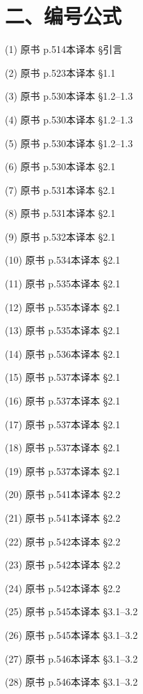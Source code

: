 \section*{二、编号公式}

\begin{termlist}
\item[(1)] 原书 p.514\quad 本译本 §引言
\item[(2)] 原书 p.523\quad 本译本 §1.1
\item[(3)] 原书 p.530\quad 本译本 §1.2--1.3
\item[(4)] 原书 p.530\quad 本译本 §1.2--1.3
\item[(5)] 原书 p.530\quad 本译本 §1.2--1.3
\item[(6)] 原书 p.530\quad 本译本 §2.1
\item[(7)] 原书 p.531\quad 本译本 §2.1
\item[(8)] 原书 p.531\quad 本译本 §2.1
\item[(9)] 原书 p.532\quad 本译本 §2.1
\item[(10)] 原书 p.534\quad 本译本 §2.1
\item[(11)] 原书 p.535\quad 本译本 §2.1
\item[(12)] 原书 p.535\quad 本译本 §2.1
\item[(13)] 原书 p.535\quad 本译本 §2.1
\item[(14)] 原书 p.536\quad 本译本 §2.1
\item[(15)] 原书 p.537\quad 本译本 §2.1
\item[(16)] 原书 p.537\quad 本译本 §2.1
\item[(17)] 原书 p.537\quad 本译本 §2.1
\item[(18)] 原书 p.537\quad 本译本 §2.1
\item[(19)] 原书 p.537\quad 本译本 §2.1
\item[(20)] 原书 p.541\quad 本译本 §2.2
\item[(21)] 原书 p.541\quad 本译本 §2.2
\item[(22)] 原书 p.542\quad 本译本 §2.2
\item[(23)] 原书 p.542\quad 本译本 §2.2
\item[(24)] 原书 p.542\quad 本译本 §2.2
\item[(25)] 原书 p.545\quad 本译本 §3.1--3.2
\item[(26)] 原书 p.545\quad 本译本 §3.1--3.2
\item[(27)] 原书 p.546\quad 本译本 §3.1--3.2
\item[(28)] 原书 p.546\quad 本译本 §3.1--3.2

\end{termlist}
